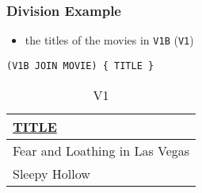 \documentclass[dvipsnames]{beamer}
\theoremstyle{plain}
\begin{document}
\begin{frame}[fragile]
  \frametitle{Division Example}

  \begin{example}
    \begin{itemize}
      \item the titles of the movies in \texttt{V1B} (\texttt{V1})
    \end{itemize}

    \begin{lstlisting}
(V1B JOIN MOVIE) { TITLE }
    \end{lstlisting}

    \pause
    \vspace{-10pt}
    \begin{tiny}
    \begin{table}
      \caption{V1}
      \begin{tabular}{|l|}\hline
\underline{TITLE}             \\[2pt]\hline\hline
Fear and Loathing in Las Vegas\\\hline
Sleepy Hollow                 \\\hline
      \end{tabular}
    \end{table}
    \end{tiny}
  \end{example}
\end{frame}
% 
% 
% 
\end{document}
